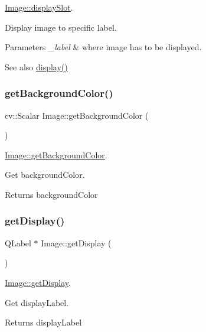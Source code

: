 \mbox{\hyperlink{class_image_a0d6d6b06c139bcecada54f98122ccb69}{Image\+::display\+Slot}}. 

Display image to specific label. 
\begin{DoxyParams}{Parameters}
{\em \+\_\+label} & where image has to be displayed. \\
\hline
\end{DoxyParams}
\begin{DoxySeeAlso}{See also}
\mbox{\hyperlink{class_image_a1ab17bfa8eb3bd96e90febe0ebf6b6f2}{display()}} 
\end{DoxySeeAlso}
\mbox{\label{class_image_ad27c80fa2dedc38a385b69fc587e80b1}} 
\subsubsection{\texorpdfstring{getBackgroundColor()}{getBackgroundColor()}}
{\footnotesize\ttfamily cv\+::\+Scalar Image\+::get\+Background\+Color (\begin{DoxyParamCaption}{ }\end{DoxyParamCaption})}



\mbox{\hyperlink{class_image_ad27c80fa2dedc38a385b69fc587e80b1}{Image\+::get\+Background\+Color}}. 

Get background\+Color. \begin{DoxyReturn}{Returns}
background\+Color 
\end{DoxyReturn}
\mbox{\label{class_image_a6d62147aced3396b08f0be7db6987732}} 
\subsubsection{\texorpdfstring{getDisplay()}{getDisplay()}}
{\footnotesize\ttfamily Q\+Label $\ast$ Image\+::get\+Display (\begin{DoxyParamCaption}{ }\end{DoxyParamCaption})}



\mbox{\hyperlink{class_image_a6d62147aced3396b08f0be7db6987732}{Image\+::get\+Display}}. 

Get display\+Label. \begin{DoxyReturn}{Returns}
display\+Label 
\end{DoxyReturn}
\mbox{\label{class_image_aa4e1f064e5e1f3f04ad605408f1ec3af}} 

